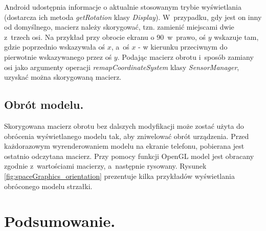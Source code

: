 \documentclass[a4paper,twocolumn,11pt]{article}
\begin{document}
 Android udostępnia informacje o aktualnie stosowanym trybie wyświetlania (dostarcza ich metoda \emph{getRotation} klasy \emph{Display}).
 W~przypadku, gdy jest on inny od domyślnego, macierz należy skorygować, tzn. zamienić miejscami dwie z~trzech osi.
 Na przykład przy obrocie ekranu o 90\textdegree~w~prawo, oś $y$ wskazuje tam, gdzie poprzednio wskazywała oś $x$, a~oś $x$ - w kierunku przeciwnym do pierwotnie wskazywanego przez oś $y$.
 Podając macierz obrotu i~sposób zamiany osi jako argumenty operacji \emph{remapCoordinateSystem} klasy \emph{SensorManager}, uzyskać można skorygowaną macierz.


\subsection{Obrót modelu.}
 Skorygowana macierz obrotu bez dalszych modyfikacji może zostać użyta do obrócenia wyświetlanego modelu tak, aby zniwelować obrót urządzenia.
 Przed każdorazowym wyrenderowaniem modelu na ekranie telefonu, pobierana jest ostatnio odczytana macierz.
 Przy pomocy funkcji OpenGL model jest obracany zgodnie z~wartościami macierzy, a~następnie rysowany.
 Rysunek \ref{fig:spaceGraphics_orientation} prezentuje kilka przykładów wyświetlania obróconego modelu strzałki.
 
 




\section{Podsumowanie.} \label{sec:summary}



\end{document}
